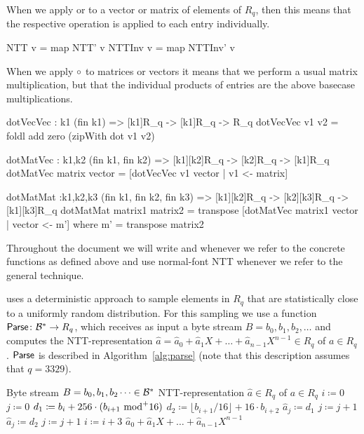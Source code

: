 When we apply \NTT or \INVNTT to a vector or matrix of elements of $R_q$,
then this means that the respective operation is applied to each entry
individually.

\begin{code}
  NTT v = map NTT' v
  NTTInv v = map NTTInv' v
\end{code}

When we apply $\circ$ to matrices or vectors it means that 
we perform a usual matrix multiplication, but that the individual products
of entries are the above basecase multiplications.

\begin{code}
  dotVecVec : {k1} (fin k1) => [k1]R_q -> [k1]R_q -> R_q
  dotVecVec v1 v2 = foldl add zero (zipWith dot v1 v2)
  
  dotMatVec : {k1,k2} (fin k1, fin k2) => [k1][k2]R_q -> [k2]R_q -> [k1]R_q
  dotMatVec matrix vector = [dotVecVec v1 vector | v1 <- matrix]
  
  dotMatMat :{k1,k2,k3} (fin k1, fin k2, fin k3) =>
    [k1][k2]R_q -> [k2][k3]R_q -> [k1][k3]R_q
  dotMatMat matrix1 matrix2 = transpose [dotMatVec matrix1 vector | vector <- m']
      where m' = transpose matrix2
\end{code}

Throughout the document we will write \NTT and \INVNTT whenever we refer
to the concrete functions as defined above and use normal-font NTT
whenever we refer to the general technique.

\Kyber uses a deterministic approach to sample elements in $R_q$
that are statistically close to a uniformly random distribution.
For this sampling we use a function $\mathsf{Parse}\colon\mathcal{B}^* \rightarrow R_q$, 
which receives as input a byte stream $B = b_0, b_1, b_2, \dots$ and
computes the NTT-representation $\hat{a} = \hat{a}_0 + \hat{a}_1 X + \dots + \hat{a}_{n-1}X^{n-1} \in R_q$ of $a \in R_q$. $\mathsf{Parse}$ is described in Algorithm~\ref{alg:parse} (note that this description assumes that $q=3329$).

\begin{algorithm}
  \caption{$\Parse\colon\Bytes^* \rightarrow R_q^n$}
  \label{alg:parse}
\begin{algorithmic}
  \Require Byte stream $B = b_0, b_1, b_2 \dots \in \mathcal{B}^*$ 
  \Ensure NTT-representation $\hat{a} \in R_q$ of $a \in R_q$
  \State $i \coloneqq 0$
  \State $j \coloneqq 0$
    \State $d_1 \coloneqq b_i + 256\cdot (b_{i+1}\text{ mod}^+ 16)$
    \State $d_2 \coloneqq \lfloor b_{i+1}/16\rfloor + 16\cdot b_{i+2}$
      \State $\hat{a}_j \coloneqq d_1$\label{line:parse:bitrev1}
      \State $j \coloneqq j+1$
    \EndIf
      \State $\hat{a}_j \coloneqq d_2$\label{line:parse:bitrev2}
      \State $j \coloneqq j+1$
    \EndIf
    \State $i \coloneqq i+3$
  \EndWhile
  \State \Return $\hat{a}_0 + \hat{a}_1 X + \dots + \hat{a}_{n-1}X^{n-1}$
\end{algorithmic}
\end{algorithm}

